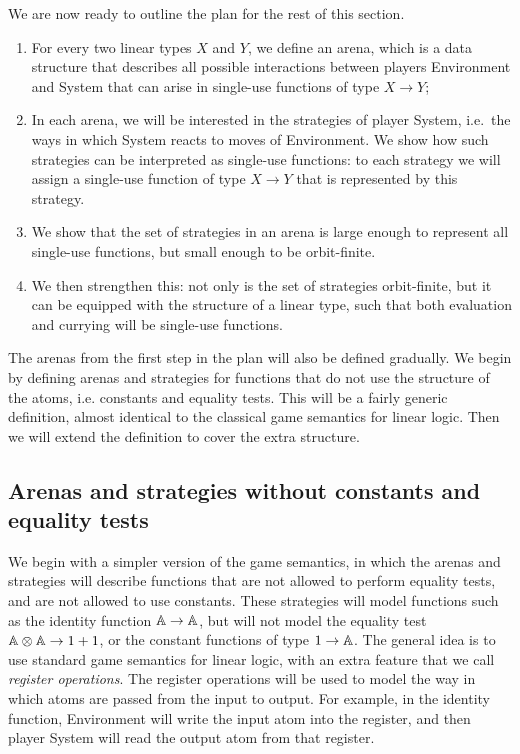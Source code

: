We are now ready to outline the plan for the rest of this section. 
\begin{enumerate}
    \item For every two linear types $X$ and $Y$, we  define an arena, which is a data structure that describes all possible interactions between players Environment and System that can arise in single-use  functions of type $X \to Y$;
    \item In each arena, we will be interested in the strategies of player System, i.e.~the ways in which System reacts to moves of Environment. We show how such strategies can be interpreted as single-use functions: to each strategy we will assign a single-use function of type $X \to Y$ that is represented by this strategy. 
    \item We show that the  set of strategies in an arena is  large enough to represent all single-use functions, but small enough to be orbit-finite. 
    \item We then strengthen this: not only is the set of strategies orbit-finite, but it can be equipped with the structure of a linear type, such that both evaluation and currying will be single-use functions.
\end{enumerate}

The arenas from the first step in the plan will also be defined gradually. We begin by defining arenas and strategies for functions that do not use the structure of the atoms, i.e. constants and equality tests. This will be a fairly generic definition, almost identical to the classical game semantics for linear logic. Then we will extend the definition to cover the extra structure. 

\subsection{Arenas and strategies without constants and equality tests}
\label{sec:arenas-without-constants-and-equality-tests}

We begin with a simpler version of the game semantics, in which the arenas and strategies will describe functions that are not allowed to perform equality tests, and are not allowed to use constants. These strategies will model functions such as the identity function $\mathbb A \to \mathbb A$, but will not model the equality test $\mathbb A \otimes \mathbb A \to 1 + 1$, or the constant functions of type $1 \to \mathbb A$. The general idea is to use standard game semantics for linear logic, with an extra feature that we call \emph{register operations}. The register operations will be used to model the way in which atoms are passed from the input to output. For example, in the identity function,  Environment will  write the input atom into the register, and then player System will read the output atom from that register. 

